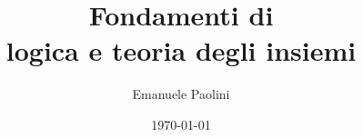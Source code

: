 \documentclass[
	fontsize=10pt, %
	twoside=true, %
	pagewidth=8.5in, %
	pageheight=11.0in, %
	numbers=noenddots, %
]{mykaobook}
\begin{document}
\nocite{forallx}

\title[Fondamenti di logica e teoria degli insiemi]{Fondamenti di \\ logica e teoria degli insiemi}
\author[EP]{Emanuele Paolini}
\date{\today}
\publishers{manu-fatto}


\frontmatter %



\maketitle

\thispagestyle{empty}
\mbox{}
\vfill
\doclicenseThis





\begingroup %

\setlength{\textheight}{230\vscale} %
\end{document}
